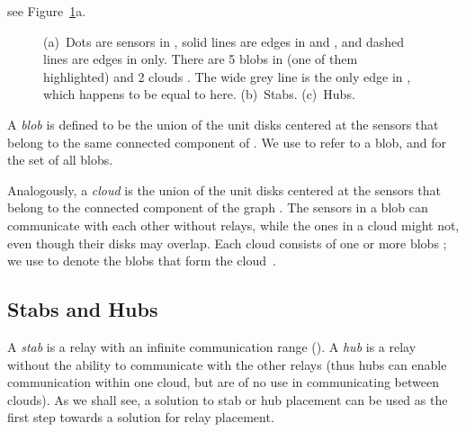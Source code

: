\documentclass[11pt,a4paper]{article}
\theoremstyle{definition}
\theoremstyle{remark}
\begin{document}
see Figure~\ref{fig:clouds}a.

\begin{figure}[t]
    \centering
    \caption{(a)~Dots are sensors in , solid lines are edges in  and , and dashed lines are edges in  only. There are 5 blobs in  (one of them highlighted) and 2 clouds . The wide grey line is the only edge in , which happens to be equal to  here. (b)~Stabs. (c)~Hubs.}\label{fig:clouds}
\end{figure}

A \emph{blob} is defined to be the union of the unit disks centered at the sensors that belong to the same connected component of . We use  to refer to a blob, and  for the set of all blobs.

Analogously, a \emph{cloud}  is the union of the unit disks centered at the sensors that belong to the connected component of the graph . The sensors in a blob can communicate with each other without relays, while the ones in a cloud might not, even though their disks may overlap. Each cloud  consists of one or more blobs ; we use  to denote the blobs that form the cloud~.

\subsection{Stabs and Hubs}

A \emph{stab} is a relay with an infinite communication range (). A \emph{hub} is a relay without the ability to communicate with the other relays (thus hubs can enable communication within one cloud, but are of no use in communicating between clouds). As we shall see, a solution to stab or hub placement can be used as the first step towards a solution for relay placement.
\end{document}
